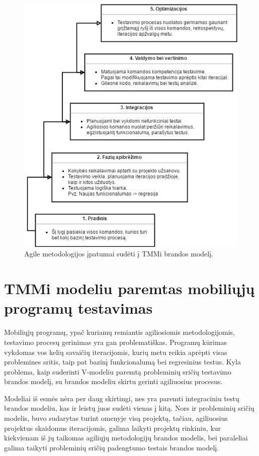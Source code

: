 \documentclass{VUMIFPSkursinis}
\begin{document}
\begin{figure}[H]
    \centering
    \includegraphics[scale=0.85]{img/Tmmagile}
    \caption{Agile metodologijos įpatumai sudėti į TMMi brandos modelį.}
    \label{img:tmmiagile}
\end{figure}

\section{TMMi modeliu paremtas mobiliųjų programų testavimas}
Mobiliųjų programų, ypač kuriamų remiantis agiliosiomis metodologijomis, testavimo procesų gerinimas yra gan problematiškas. Programų kūrimas vykdomas vos kelių savaičių iteracijomis, kurių metu reikia aprėpti visas problemines sritis, taip pat bazinį funkcionalumą bei regresinius testus. Kyla problema, kaip suderinti V-modeliu paremtą probleminių sričių testavimo brandos modelį, su brandos modeliu skirtu gerinti agiliuosius procesus.

Modeliai iš esmės nėra per daug skirtingi, nes yra paremti integraciniu testų brandos modeliu, kas ir leistų juos sudėti vienas į kitą. Nors ir probleminių sričių modelis, buvo sudarytas turint omenyje visą projektą, tačiau, agiliuosius projektus skaidomus iteracijomis, galima laikyti projektų rinkiniu, kur kiekvienam iš jų taikomas agiliųjų metodologijų brandos modelis, bei paraleliai galima taikyti probleminių sričių padengtumo testais brandos modelį.
\end{document}
